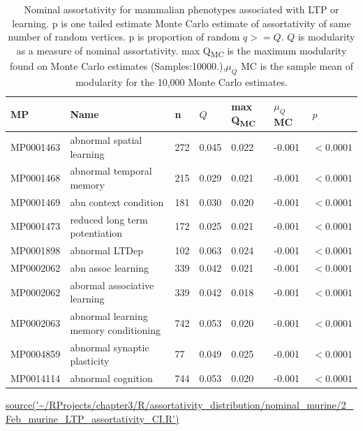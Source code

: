 \begin{table}[ht]
\centering
\setlength{\extrarowheight}{2pt}
\begin{adjustbox}{width=\textwidth}


\begin{tabular}{lllllll}
  \toprule
MP & Name & n & $Q$ & max Q\textsubscript{MC} & $\mu_Q$ MC & $p$ \\ 
  \midrule
MP0001463 & abnormal spatial learning & 272 & 0.045 & 0.022 & -0.001 & $<0.0001$ \\ 
  MP0001468 & abnormal temporal memory & 215 & 0.029 & 0.021 & -0.001 & $<0.0001$ \\ 
  MP0001469 & abn context condition & 181 & 0.030 & 0.020 & -0.001 & $<0.0001$ \\ 
  MP0001473 & reduced long term potentiation & 172 & 0.025 & 0.021 & -0.001 & $<0.0001$ \\ 
  MP0001898 & abnormal LTDep & 102 & 0.063 & 0.024 & -0.001 & $<0.0001$ \\ 
  MP0002062 & abn assoc learning & 339 & 0.042 & 0.021 & -0.001 & $<0.0001$ \\ 
  MP0002062 & abormal associative learning & 339 & 0.042 & 0.018 & -0.001 & $<0.0001$ \\ 
  MP0002063 & abnormal learning memory conditioning & 742 & 0.053 & 0.020 & -0.001 & $<0.0001$ \\ 
  MP0004859 & abnormal synaptic plasticity & 77 & 0.049 & 0.025 & -0.001 & $<0.0001$ \\ 
  MP0014114 & abnormal cognition & 744 & 0.053 & 0.020 & -0.001 & $<0.0001$ \\ 
   \bottomrule
\end{tabular}
\end{adjustbox}
\caption[Nominal assortativity of gene sets of mammalian phenotypes associated with LTP or learning]{Nominal assortativity for mammalian phenotypes associated with LTP or learning. p is one tailed estimate Monte Carlo estimate of assortativity of same number of random vertices. p is proportion of random $q>=Q$. $Q$ is modularity as a measure of nominal assortativity. max Q\textsubscript{MC} is the maximum modularity found on Monte Carlo estimates (Samples:10000.),$\mu_Q$ MC is the sample mean of modularity for the 10,000 Monte Carlo estimates. }
\tiny\url{source('~/RProjects/chapter3/R/assortativity_distribution/nominal_murine/2_Feb_murine_LTP_assortativity_CI.R')} 
\label{tab:Nominal assortativity for mammalian phenotypes. p is one tailed estimate Monte Carlo estimate of assortativity of same number of random vertices. p is proportion of random $q>=Q$. Samples:10000}
\end{table}

